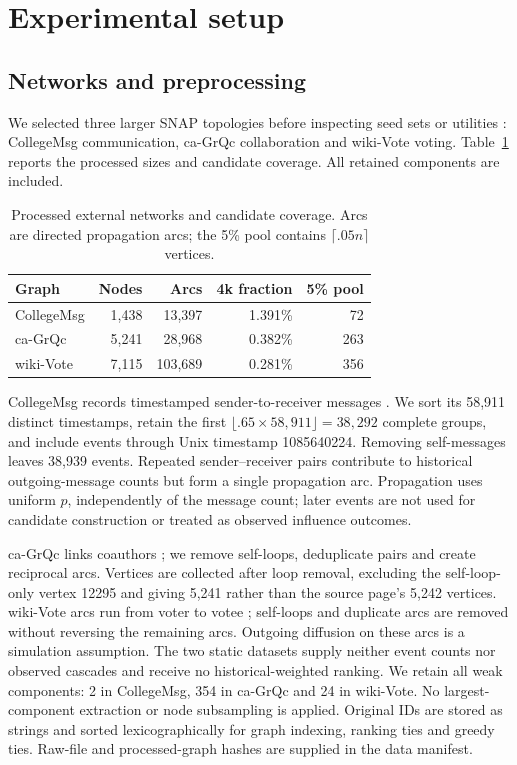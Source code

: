 \documentclass[smallextended]{svjour3}
\begin{document}
\section{Experimental setup}
\subsection{Networks and preprocessing}
We selected three larger SNAP topologies before inspecting seed sets or utilities \cite{snap}: CollegeMsg communication, ca-GrQc collaboration and wiki-Vote voting. Table~\ref{tab:data} reports the processed sizes and candidate coverage. All retained components are included.
\begin{table}[htbp]
\caption{Processed external networks and candidate coverage. Arcs are directed propagation arcs; the 5\% pool contains $\lceil .05n\rceil$ vertices.}\label{tab:data}
\begin{tabular}{lrrrr}
\toprule
Graph & Nodes & Arcs & 4k fraction & 5\% pool \\
\midrule
CollegeMsg & 1,438 & 13,397 & 1.391\% & 72 \\
ca-GrQc & 5,241 & 28,968 & 0.382\% & 263 \\
wiki-Vote & 7,115 & 103,689 & 0.281\% & 356 \\
\bottomrule
\end{tabular}
\end{table}

CollegeMsg records timestamped sender-to-receiver messages \cite{college}. We sort its 58,911 distinct timestamps, retain the first $\lfloor .65\times58,911\rfloor=38,292$ complete groups, and include events through Unix timestamp 1085640224. Removing self-messages leaves 38,939 events. Repeated sender--receiver pairs contribute to historical outgoing-message counts but form a single propagation arc. Propagation uses uniform $p$, independently of the message count; later events are not used for candidate construction or treated as observed influence outcomes.

ca-GrQc links coauthors \cite{grqc}; we remove self-loops, deduplicate pairs and create reciprocal arcs. Vertices are collected after loop removal, excluding the self-loop-only vertex 12295 and giving 5,241 rather than the source page's 5,242 vertices. wiki-Vote arcs run from voter to votee \cite{signed,links}; self-loops and duplicate arcs are removed without reversing the remaining arcs. Outgoing diffusion on these arcs is a simulation assumption. The two static datasets supply neither event counts nor observed cascades and receive no historical-weighted ranking. We retain all weak components: 2 in CollegeMsg, 354 in ca-GrQc and 24 in wiki-Vote. No largest-component extraction or node subsampling is applied. Original IDs are stored as strings and sorted lexicographically for graph indexing, ranking ties and greedy ties. Raw-file and processed-graph hashes are supplied in the data manifest.
\end{document}
